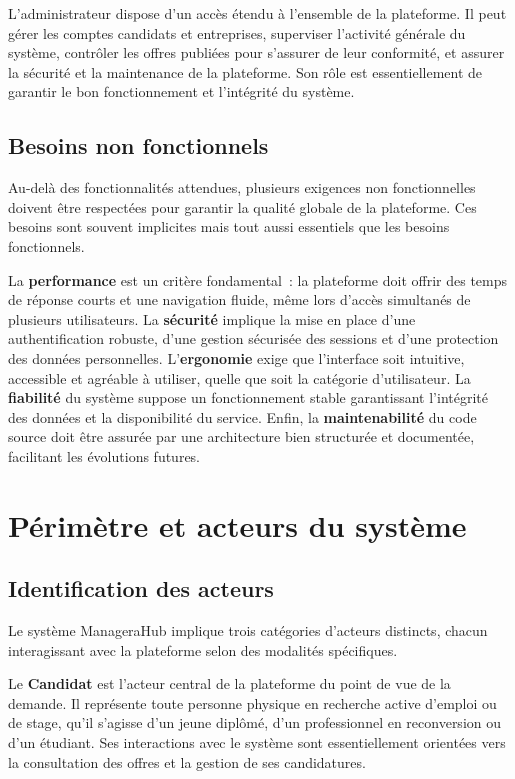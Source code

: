 \documentclass[12pt,a4paper]{report}
\begin{document}
L'administrateur dispose d'un accès étendu à l'ensemble de la plateforme. Il peut gérer les comptes candidats et entreprises, superviser l'activité générale du système, contrôler les offres publiées pour s'assurer de leur conformité, et assurer la sécurité et la maintenance de la plateforme. Son rôle est essentiellement de garantir le bon fonctionnement et l'intégrité du système.

\subsection{Besoins non fonctionnels}

Au-delà des fonctionnalités attendues, plusieurs exigences non fonctionnelles doivent être respectées pour garantir la qualité globale de la plateforme. Ces besoins sont souvent implicites mais tout aussi essentiels que les besoins fonctionnels.

La \textbf{performance} est un critère fondamental~: la plateforme doit offrir des temps de réponse courts et une navigation fluide, même lors d'accès simultanés de plusieurs utilisateurs. La \textbf{sécurité} implique la mise en place d'une authentification robuste, d'une gestion sécurisée des sessions et d'une protection des données personnelles. L'\textbf{ergonomie} exige que l'interface soit intuitive, accessible et agréable à utiliser, quelle que soit la catégorie d'utilisateur. La \textbf{fiabilité} du système suppose un fonctionnement stable garantissant l'intégrité des données et la disponibilité du service. Enfin, la \textbf{maintenabilité} du code source doit être assurée par une architecture bien structurée et documentée, facilitant les évolutions futures.

\section{Périmètre et acteurs du système}

\subsection{Identification des acteurs}

Le système ManageraHub implique trois catégories d'acteurs distincts, chacun interagissant avec la plateforme selon des modalités spécifiques.

Le \textbf{Candidat} est l'acteur central de la plateforme du point de vue de la demande. Il représente toute personne physique en recherche active d'emploi ou de stage, qu'il s'agisse d'un jeune diplômé, d'un professionnel en reconversion ou d'un étudiant. Ses interactions avec le système sont essentiellement orientées vers la consultation des offres et la gestion de ses candidatures.
\end{document}

